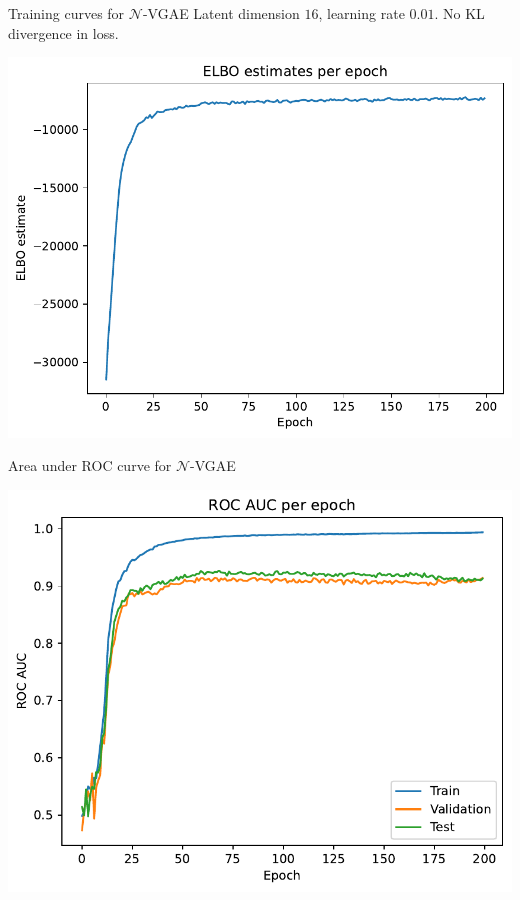 \begin{frame}{Training curves for $\mathcal{N}$-VGAE}
  Latent dimension $16$, learning rate $0.01$. No KL divergence in loss.
  \begin{center}
    \includegraphics[width=.8\hsize]{figures/normal_elbo_estimates.pdf}
  \end{center}
\end{frame}

\begin{frame}{Area under ROC curve for $\mathcal{N}$-VGAE}
  \begin{center}
    \includegraphics[width=.8\hsize]{figures/normal_auc.pdf}
  \end{center}
\end{frame}

